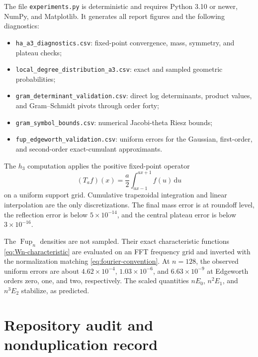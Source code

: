 \documentclass[11pt,oneside]{article}
\theoremstyle{definition}
\theoremstyle{remark}
\newcommand{\Fup}{\operatorname{Fup}}
\newcommand{\dd}{\,\mathrm{d}}
\begin{document}
The file \texttt{experiments.py} is deterministic and requires Python 3.10 or newer, NumPy,
and Matplotlib.  It generates all report figures and the following diagnostics:
\begin{itemize}
  \item \texttt{ha\_a3\_diagnostics.csv}: fixed-point convergence, mass, symmetry, and plateau checks;
  \item \texttt{local\_degree\_distribution\_a3.csv}: exact and sampled geometric probabilities;
  \item \texttt{gram\_determinant\_validation.csv}: direct log determinants, product values, and Gram--Schmidt pivots through order forty;
  \item \texttt{gram\_symbol\_bounds.csv}: numerical Jacobi-theta Riesz bounds;
  \item \texttt{fup\_edgeworth\_validation.csv}: uniform errors for the Gaussian, first-order, and second-order exact-cumulant approximants.
\end{itemize}

The \(h_3\) computation applies the positive fixed-point operator
\begin{equation}
  (T_af)(x)=\frac a2\int_{ax-1}^{ax+1}f(u)\dd u
  \label{eq:numerical-Ta}
\end{equation}
on a uniform support grid.  Cumulative trapezoidal integration and linear interpolation are the
only discretizations.  The final mass error is at roundoff level, the reflection error is below
\(5\times10^{-14}\), and the central plateau error is below \(3\times10^{-16}\).

The \(\Fup_n\) densities are not sampled.  Their exact characteristic functions
\eqref{eq:Wn-characteristic} are evaluated on an FFT frequency grid and inverted with the
normalization matching \eqref{eq:fourier-convention}.  At \(n=128\), the observed uniform errors are about
\(4.62\times10^{-4}\), \(1.03\times10^{-6}\), and \(6.63\times10^{-9}\) at Edgeworth orders
zero, one, and two, respectively.  The scaled quantities \(nE_0\), \(n^2E_1\), and
\(n^3E_2\) stabilize, as predicted.

\section{Repository audit and nonduplication record}
\label{app:audit}
\end{document}
